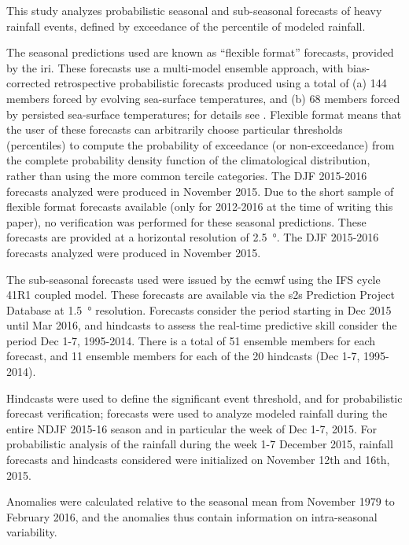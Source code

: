 \documentclass[twocol]{ametsoc}
\begin{document}
This study analyzes probabilistic seasonal and sub-seasonal forecasts of heavy rainfall events, defined by exceedance of the  percentile of modeled rainfall.

The seasonal predictions used  are known as ``flexible format'' forecasts, provided by the \gls{iri}.
These forecasts use a multi-model ensemble approach, with bias-corrected retrospective probabilistic forecasts produced using a total of (a) 144 members forced by evolving sea-surface temperatures, and (b) 68 members forced by persisted sea-surface temperatures; for details see \citet{Barnston2010}.
Flexible format means that the user of these forecasts can arbitrarily choose  particular thresholds (percentiles) to compute the  probability of exceedance (or non-exceedance) from the complete  probability density function of the climatological distribution,  rather than using the more common tercile categories.
The DJF 2015-2016 forecasts analyzed were produced in  November 2015.
Due to the short sample of flexible format forecasts available (only for 2012-2016 at the time of writing this paper), no verification was performed for these seasonal predictions.
These forecasts are provided at a horizontal  resolution of \SI{2.5}{\degree}.
The DJF 2015-2016 forecasts analyzed were produced in November 2015.

The sub-seasonal forecasts used were issued by the \gls{ecmwf} using the IFS cycle 41R1 coupled model.
These forecasts are available via the \gls{s2s} Prediction Project Database \citep{Vitart2016} at \SI{1.5}{\degree} resolution.
Forecasts consider the period starting in Dec 2015 until Mar 2016, and hindcasts to assess the real-time predictive skill consider the period Dec 1-7, 1995-2014.
There is a total of 51 ensemble members for each forecast, and 11 ensemble members for each of the 20 hindcasts (Dec 1-7, 1995-2014).

Hindcasts were used to define the significant event threshold, and for probabilistic forecast verification; forecasts were used to analyze modeled rainfall during the entire NDJF 2015-16 season and in particular the week of Dec 1-7, 2015.
For probabilistic analysis of the rainfall during the week 1-7 December 2015, rainfall forecasts and hindcasts considered were initialized on November 12th and 16th, 2015.

Anomalies were calculated relative to the seasonal mean from November 1979 to February 2016, and the anomalies thus contain information on intra-seasonal variability.

\end{document}
